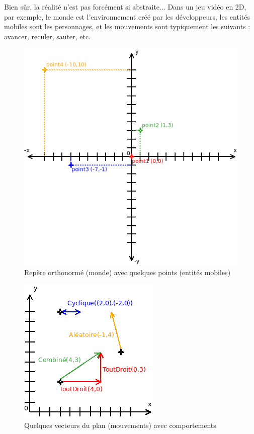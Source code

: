 \documentclass[a4paper,10pt]{report}
\begin{document}
Bien sûr, la réalité n'est pas forcément si abstraite... Dans un jeu vidéo en 2D, par exemple, le monde est l'environnement créé par les développeurs, les entités mobiles sont les personnages, et les mouvements sont typiquement les suivants : avancer, reculer, sauter, etc.

\vspace{1pt}

\begin{figure}[h]
 \begin{center}
  \includegraphics[scale=.6]{monde.png}
 \end{center}
 \caption{Repère orthonormé (monde) avec quelques points (entités mobiles)}
\end{figure}

\vspace{1pt}

\begin{figure}[!h]
 \begin{center}
  \includegraphics[scale=.6]{mouvements.png}
 \end{center}
 \caption{Quelques vecteurs du plan (mouvements) avec comportements}
\end{figure}
\end{document}
